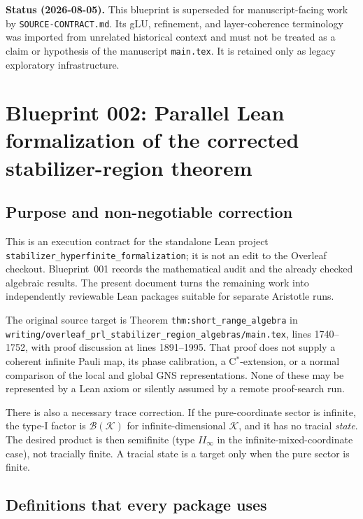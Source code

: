 \documentclass{article}
\newcommand{\cB}{\mathcal B}
\begin{document}
\sloppy

\noindent\textbf{Status (2026-08-05).} This blueprint is superseded for
manuscript-facing work by \texttt{SOURCE-CONTRACT.md}. Its gLU, refinement,
and layer-coherence terminology was imported from unrelated historical context
and must not be treated as a claim or hypothesis of the manuscript
\texttt{main.tex}. It is retained only as legacy exploratory infrastructure.

\section*{Blueprint 002: Parallel Lean formalization of the corrected stabilizer-region theorem}

\subsection*{Purpose and non-negotiable correction}

This is an execution contract for the standalone Lean project
\texttt{stabilizer\_hyperfinite\_formalization}; it is not an edit to the
Overleaf checkout.  Blueprint~001 records the mathematical audit and the
already checked algebraic results.  The present document turns the remaining
work into independently reviewable Lean packages suitable for separate
Aristotle runs.

The original source target is Theorem \texttt{thm:short\_range\_algebra} in
\texttt{writing/overleaf\_prl\_stabilizer\_region\_algebras/main.tex},
lines 1740--1752, with proof discussion at lines 1891--1995.  That proof does
not supply a coherent infinite Pauli map, its phase calibration, a
C\(^*\)-extension, or a normal comparison of the local and global GNS
representations.  None of these may be represented by a Lean axiom or silently
assumed by a remote proof-search run.

There is also a necessary trace correction.  If the pure-coordinate sector is
infinite, the type-I factor is \(\cB(\mathcal K)\) for infinite-dimensional
\(\mathcal K\), and it has no tracial \emph{state}.  The desired product is
then semifinite (type \(II_\infty\) in the infinite-mixed-coordinate case),
not tracially finite.  A tracial state is a target only when the pure sector is
finite.

\subsection*{Definitions that every package uses}
\end{document}
